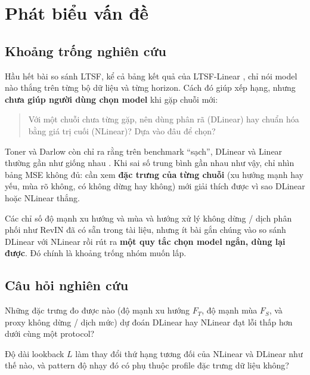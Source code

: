 \section{Phát biểu vấn đề}
\label{sec:problem}

\subsection{Khoảng trống nghiên cứu}

Hầu hết bài so sánh LTSF, kể cả bảng kết quả của LTSF-Linear \cite{zeng2023ltsf},
chỉ nói model nào thắng trên từng bộ dữ liệu và từng horizon.
Cách đó giúp xếp hạng, nhưng \textbf{chưa giúp người dùng chọn model} khi gặp chuỗi mới:

\begin{quote}
      Với một chuỗi chưa từng gặp, nên dùng phân rã (DLinear) hay chuẩn hóa bằng giá trị cuối
      (NLinear)? Dựa vào đâu để chọn?
\end{quote}

Toner và Darlow còn chỉ ra rằng trên benchmark ``sạch'', DLinear và Linear thường gần như
giống nhau \cite{toner2024linear}. Khi sai số trung bình gần nhau như vậy, chỉ nhìn bảng MSE
không đủ: cần xem \textbf{đặc trưng của từng chuỗi} (xu hướng mạnh hay yếu, mùa rõ không,
có không dừng hay không) mới giải thích được vì sao DLinear hoặc NLinear thắng.

Các chỉ số độ mạnh xu hướng và mùa \cite{hyndman2021fpp3,cleveland1990stl} và hướng xử lý
không dừng / dịch phân phối như RevIN \cite{kim2022revin} đã có sẵn trong tài liệu,
nhưng ít bài gắn chúng vào so sánh DLinear với NLinear rồi rút ra
\textbf{một quy tắc chọn model ngắn, dùng lại được}.
Đó chính là khoảng trống nhóm muốn lấp.


\subsection{Câu hỏi nghiên cứu}

\begin{description}[style=nextline,leftmargin=2.2em]
      \item[RQ1: Đặc trưng dữ liệu đến mô hình thắng.]
            Những đặc trưng đo được nào (độ mạnh xu hướng \(F_T\), độ mạnh mùa \(F_S\),
            và proxy không dừng / dịch mức) dự đoán DLinear hay NLinear đạt lỗi thấp hơn
            dưới cùng một protocol?
      \item[RQ2: Lookback và đặc trưng dữ liệu.]
            Độ dài lookback \(L\) làm thay đổi thứ hạng tương đối của NLinear và DLinear như thế nào,
            và pattern độ nhạy đó có phụ thuộc profile đặc trưng dữ liệu không?
\end{description}

